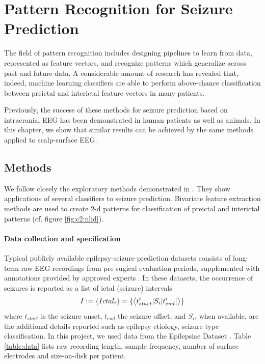 
\chapter{Pattern Recognition for Seizure Prediction}
\label{ch:2deterministic}
The field of pattern recognition includes designing pipelines to learn from data, represented as feature vectors, and recognize patterns which generalize across past and future data. A considerable amount of research has revealed that, indeed, machine learning classifiers are able to perform above-chance classification between preictal and interictal feature vectors in many patients.

Previously, the success of these methods for seizure prediction based on intracranial EEG has been demonstrated \cite{mirowski2009classification, kaggle2014contests} in human patients as well as animals. In this chapter, we show that similar results can be achieved by the same methods applied to scalp-surface EEG.


\section{Methods}
We follow closely the exploratory methods demonstrated in \citet{mirowski2009classification}. They show applications of several classifiers to seizure prediction. Bivariate feature extraction methods are used to create 2-d patterns for classification of preictal and interictal patterns (cf. figure \ref{fig:c2:nlid}).


\subsubsection{Data collection and specification}

Typical publicly available epilepsy-seizure-prediction datasets consists of long-term raw EEG recordings from pre-sugical evaluation periods, supplemented with annotations provided by approved experts \cite{handa2021open}. In these datasets, the occurrence of seizures is reported as a list of ictal (seizure) intervals
\begin{equation}
    I := \{Ictal_i\} = \{\bra{t_{start}^i|S_i|t_{end}^i} \ket{}\}
\label{eq:define_ictal}
\end{equation}
where $t_{start}$ is the seizure onset, $t_{end}$ the seizure offset, and $S_i$, when available, are the additional details reported such as epilepsy etiology, seizure type classification.
In this project, we used data from the Epilepsiae Dataset \cite{ihle2012epilepsiae}. Table \ref{table:data} lists raw recording length, sample frequency, number of surface electrodes and size-on-disk per patient.


